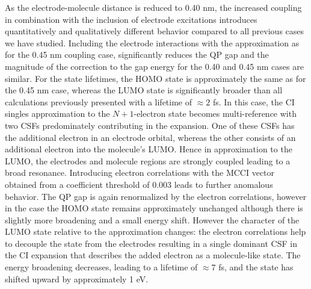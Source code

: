 As the electrode-molecule distance is reduced to 0.40 nm, the increased
coupling in combination with the inclusion of electrode excitations
introduces quantitatively and qualitatively different behavior compared
to all previous cases we have studied. Including the electrode interactions
with the \dscf approximation as for the 0.45 nm coupling case,
significantly reduces the QP gap and the magnitude of the correction to
the gap energy for the 0.40 and 0.45 nm cases are similar. For the state
lifetimes, the HOMO state is approximately the same as for the 0.45 nm
case, whereas the LUMO state is significantly broader than all calculations
previously presented with a lifetime of $\approx 2$ fs. In this case,
the CI singles approximation to the $N+1$-electron state becomes
multi-reference with two CSFs predominately contributing in the expansion.
One of these CSFs has the additional electron in an electrode orbital,
whereas the other consists of an additional electron into the molecule's
LUMO. Hence in \dscf approximation to the LUMO, the electrodes and
molecule regions are strongly coupled leading to a broad resonance.
Introducing electron correlations with the MCCI vector obtained from a
coefficient threshold of 0.003 leads to further anomalous behavior. The
QP gap is again renormalized by the electron correlations, however in the
case the HOMO state remains approximately unchanged although there is
slightly more broadening and a small energy shift. However the character
of the LUMO state relative to the \dscf approximation changes: the
electron correlations help to decouple the state from the electrodes
resulting in a single dominant CSF in the CI expansion that describes the
added electron as a molecule-like state. The energy broadening decreases,
leading to a lifetime of $\approx 7$ fs, and the state has shifted upward
by approximately 1 eV.
 
